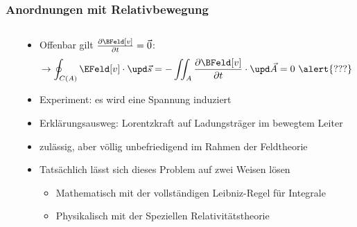 \begin{frame}
  \frametitle{Anordnungen mit Relativbewegung}
  \begin{columns}
    \begin{column}{.4\textwidth}
  \resizebox{\columnwidth}{!}{}
    \end{column}
    \begin{column}{.6\textwidth}
  \begin{itemize}[<+->]
  \item Offenbar gilt $\frac{\partial \BFeld[v]}{\partial t} = \vec{0}$:
    $$
    \to \oint_{C(A)} \EFeld[v]\cdot\upd\vec{s} = -\iint_{A} \frac{\partial \BFeld[v]}{\partial t} \cdot \upd \vec{A} = 0 \text{ \alert{???}}
    $$
  \item Experiment: \alert{es wird eine Spannung induziert}
  \item Erklärungsausweg: \alert{Lorentzkraft} auf Ladungsträger im bewegtem Leiter
  \item zulässig, aber völlig \alert{unbefriedigend} im Rahmen der Feldtheorie
  \item Tatsächlich lässt sich dieses Problem auf zwei Weisen lösen
    \begin{itemize}[<+->]
    \item \alert{Mathematisch} mit der vollständigen \alert{Leibniz-Regel für Integrale}
     \item \alert{Physikalisch} mit der \alert{Speziellen Relativitätstheorie}
      \end{itemize}
  \end{itemize}
      \end{column}
    \end{columns}
\end{frame}

